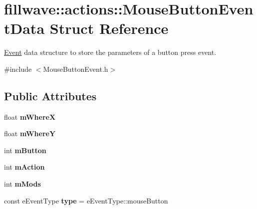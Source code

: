\hypertarget{structfillwave_1_1actions_1_1MouseButtonEventData}{}\section{fillwave\+:\+:actions\+:\+:Mouse\+Button\+Event\+Data Struct Reference}
\label{structfillwave_1_1actions_1_1MouseButtonEventData}


\hyperlink{classfillwave_1_1actions_1_1Event}{Event} data structure to store the parameters of a button press event.  




{\ttfamily \#include $<$Mouse\+Button\+Event.\+h$>$}

\subsection*{Public Attributes}
\begin{DoxyCompactItemize}
\item 
\hypertarget{structfillwave_1_1actions_1_1MouseButtonEventData_a44dbb23e004b5b8f5a411f3752c22110}{}float {\bfseries m\+Where\+X}\label{structfillwave_1_1actions_1_1MouseButtonEventData_a44dbb23e004b5b8f5a411f3752c22110}

\item 
\hypertarget{structfillwave_1_1actions_1_1MouseButtonEventData_a2336cde2f980612c1980c3bb497838a3}{}float {\bfseries m\+Where\+Y}\label{structfillwave_1_1actions_1_1MouseButtonEventData_a2336cde2f980612c1980c3bb497838a3}

\item 
\hypertarget{structfillwave_1_1actions_1_1MouseButtonEventData_acab5f09b71ea47dd1a89686e5a011505}{}int {\bfseries m\+Button}\label{structfillwave_1_1actions_1_1MouseButtonEventData_acab5f09b71ea47dd1a89686e5a011505}

\item 
\hypertarget{structfillwave_1_1actions_1_1MouseButtonEventData_a39f005f4a802cab2835610fd00c882d9}{}int {\bfseries m\+Action}\label{structfillwave_1_1actions_1_1MouseButtonEventData_a39f005f4a802cab2835610fd00c882d9}

\item 
\hypertarget{structfillwave_1_1actions_1_1MouseButtonEventData_a0dd7a2db4f86c9aed6967c7930689144}{}int {\bfseries m\+Mods}\label{structfillwave_1_1actions_1_1MouseButtonEventData_a0dd7a2db4f86c9aed6967c7930689144}

\item 
\hypertarget{structfillwave_1_1actions_1_1MouseButtonEventData_abd86614b8765b9930160c728bac4f790}{}const e\+Event\+Type {\bfseries type} = e\+Event\+Type\+::mouse\+Button\label{structfillwave_1_1actions_1_1MouseButtonEventData_abd86614b8765b9930160c728bac4f790}

\end{DoxyCompactItemize}


